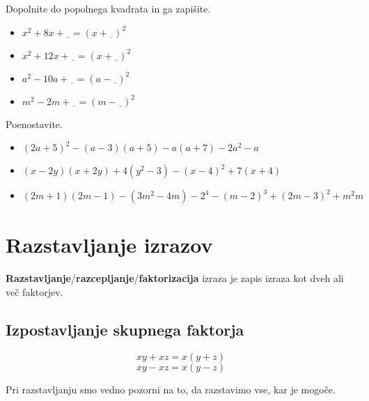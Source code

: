                \begin{naloga}
                    Dopolnite do popolnega kvadrata in ga zapišite.
                    \begin{itemize}
                        \item $x^2+8x+\underline{\ \ }=(x+\underline{\ \ })^2$ 
                        \item $x^2+12x+\underline{\ \ }=(x+\underline{\ \ })^2$ 
                        \item $a^2-10a+\underline{\ \ }=(a-\underline{\ \ })^2$ 
                        \item $m^2-2m+\underline{\ \ }=(m-\underline{\ \ })^2$ 
                    \end{itemize}
                \end{naloga}


                \begin{naloga}
                    Poenostavite.
                    \begin{itemize}
                        \item $(2a+5)^2-(a-3)(a+5)-a(a+7)-2a^2-a$ 
                        \item $(x-2y)(x+2y)+4(y^2-3)-(x-4)^2+7(x+4)$ 
                        \item $(2m+1)(2m-1)-(3m^2-4m)-2^4-(m-2)^3+(2m-3)^2+m^2m$ 
                    \end{itemize}
                \end{naloga}

\newpage

\section{Razstavljanje izrazov}
                    
        \textbf{Razstavljanje}/\textbf{razcepljanje}/\textbf{faktorizacija} izraza je zapis izraza kot dveh ali več faktorjev.
                    
        \subsection*{Izpostavljanje skupnega faktorja}
                $$xy+ xz=x(y+ z)$$            
                $$xy- xz=x(y- z)$$            
            
        Pri razstavljanju smo vedno pozorni na to, da razstavimo vse, kar je mogoče.
        ~\newline
        
